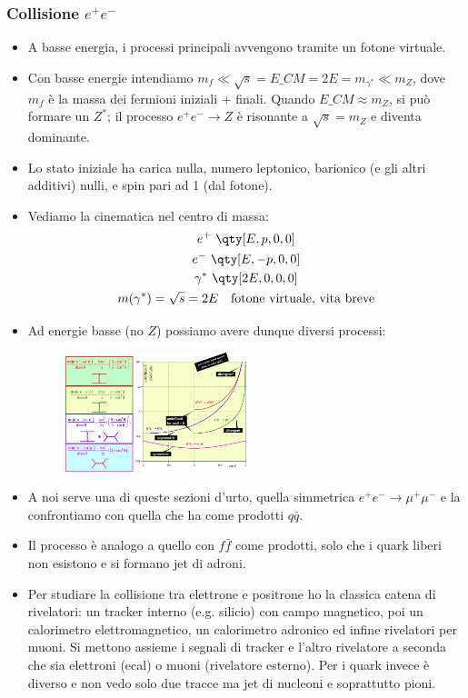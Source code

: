 \subsubsection{Collisione $e^+e^-$}
\begin{itemize}
\item A basse energia, i processi principali avvengono tramite un fotone virtuale.
\item Con basse energie intendiamo $m_f\ll\sqrt s=E\_{CM}=2E=m_{\gamma^*}\ll m_Z$, dove $m_f$ è la massa dei fermioni iniziali + finali. Quando $E\_{CM}\approx m_Z$, si può formare un $Z^*$; il processo $e^+e^-\to Z$ è risonante a $\sqrt s=m_Z$ e diventa dominante.
\item Lo stato iniziale ha carica nulla, numero leptonico, barionico (e gli altri additivi) nulli, e spin pari ad 1 (dal fotone).
\item Vediamo la cinematica nel centro di massa:
\begin{gather*}
e^+\,\, \qty[E,p,0,0]\\
e^-\,\,\qty[E,-p,0,0]\\
\gamma^*\,\,\qty[2E,0,0,0]\\
m(\gamma^*)=\sqrt{s}=2E\quad\text{fotone virtuale, vita breve}
\end{gather*}
\item Ad energie basse (no $Z$) possiamo avere dunque diversi processi:
\begin{figure}[H]
    \centering
    \includegraphics[width=0.5\textwidth]{immagini/fig_qed_sez_urto.png}
  \end{figure}
  \item A noi serve una di queste sezioni d'urto, quella simmetrica $e^+e^-\to \mu^+\mu^-$ e la confrontiamo con quella che ha come prodotti $q\bar q$.
  \item Il processo è analogo a quello con $f\bar f$ come prodotti, solo che i quark liberi non esistono e si formano jet di adroni.
  \item Per studiare la collisione tra elettrone e positrone ho la classica catena di rivelatori: un tracker interno (e.g. silicio) con campo magnetico, poi un calorimetro elettromagnetico, un calorimetro adronico ed infine rivelatori per muoni. Si mettono assieme i segnali di tracker e l'altro rivelatore a seconda che sia elettroni (ecal) o muoni (rivelatore esterno). Per i quark invece è diverso e non vedo solo due tracce ma jet di nucleoni e soprattutto pioni.

\end{itemize}
